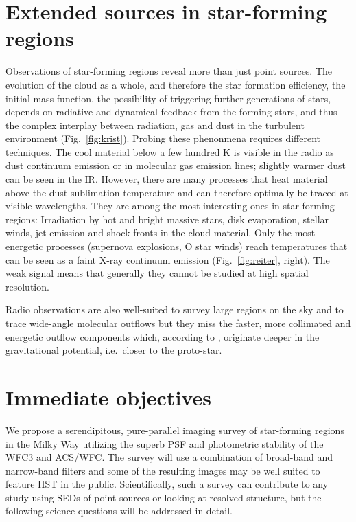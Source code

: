 \documentclass[12pt]{article}
\begin{document}
\section{Extended sources in star-forming regions}
Observations of star-forming regions reveal more than just point sources. The evolution of the
cloud as a whole, and therefore the star formation efficiency, the initial mass function, the possibility of triggering further generations of stars, depends on radiative and dynamical feedback from the forming stars, and thus the complex interplay between radiation, gas and dust in the turbulent environment (Fig.~\ref{fig:krist}). Probing these phenonmena requires different techniques. The
cool material below a few hundred K is visible in the radio as dust continuum
emission or in molecular gas emission lines; slightly warmer dust can be seen in
the IR. However, there are many processes that heat material above the dust
sublimation temperature and can therefore optimally be traced at visible wavelengths. 
They are among the most interesting ones in star-forming regions:
Irradiation by hot and bright massive stars, disk evaporation, stellar winds,
jet emission and shock fronts in the cloud material. Only the most energetic
processes (supernova explosions, O star winds) reach temperatures that can be seen as a faint
X-ray continuum emission (Fig.~\ref{fig:reiter}, right). The weak signal means that generally they 
cannot be studied at high spatial resolution.

Radio observations are also well-suited to survey large regions on the sky and to
trace wide-angle molecular outflows \citep[e.g.][]{2003MNRAS.341..707C} but
they miss the faster, more collimated and energetic outflow components which, according to \citep{2003ApJ...590L.107A}, originate
deeper in the gravitational potential, i.e.\ closer to the proto-star.


\section{Immediate objectives}
We propose a serendipitous, pure-parallel imaging survey of star-forming regions in the Milky Way utilizing the superb PSF and photometric stability of the WFC3 and ACS/WFC. The survey will use a combination of broad-band and narrow-band filters and some of the resulting images may be well suited to feature HST in the public.
Scientifically, such a survey can contribute to any study using SEDs of point sources or looking at resolved structure, but the following science questions will be addressed in detail.
\end{document}
